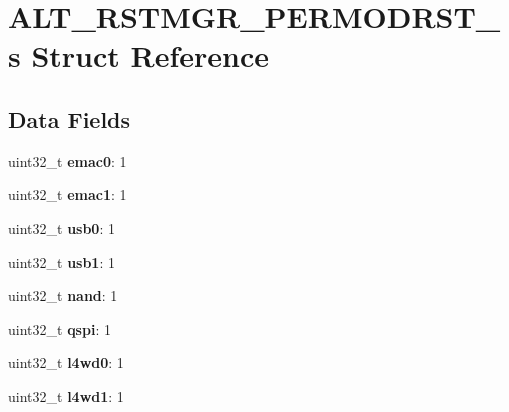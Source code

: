\hypertarget{structALT__RSTMGR__PERMODRST__s}{}\section{A\+L\+T\+\_\+\+R\+S\+T\+M\+G\+R\+\_\+\+P\+E\+R\+M\+O\+D\+R\+S\+T\+\_\+s Struct Reference}
\label{structALT__RSTMGR__PERMODRST__s}
\subsection*{Data Fields}
\begin{DoxyCompactItemize}
\item 
\mbox{\label{structALT__RSTMGR__PERMODRST__s_adfff218395efc631e0f0aeed3fa7256b}} 
uint32\+\_\+t {\bfseries emac0}\+: 1
\item 
\mbox{\label{structALT__RSTMGR__PERMODRST__s_a8b3dbb3ea0bcd294783259712868d7a6}} 
uint32\+\_\+t {\bfseries emac1}\+: 1
\item 
\mbox{\label{structALT__RSTMGR__PERMODRST__s_acf196eec7b98ac7cc7ab36801ee6f7af}} 
uint32\+\_\+t {\bfseries usb0}\+: 1
\item 
\mbox{\label{structALT__RSTMGR__PERMODRST__s_a599b962f7a67db3300dfba467865b794}} 
uint32\+\_\+t {\bfseries usb1}\+: 1
\item 
\mbox{\label{structALT__RSTMGR__PERMODRST__s_a5d51f45f8f6e18b527633007dbe75e00}} 
uint32\+\_\+t {\bfseries nand}\+: 1
\item 
\mbox{\label{structALT__RSTMGR__PERMODRST__s_a9aa6ba8945d17d631667345ae2d0c7f3}} 
uint32\+\_\+t {\bfseries qspi}\+: 1
\item 
\mbox{\label{structALT__RSTMGR__PERMODRST__s_a9878a8d7b4eb27cb8e41d361ee0924f1}} 
uint32\+\_\+t {\bfseries l4wd0}\+: 1
\item 
\mbox{\label{structALT__RSTMGR__PERMODRST__s_a5aee9861991f7c7f07ced94e51b55b00}} 
uint32\+\_\+t {\bfseries l4wd1}\+: 1

\end{DoxyCompactItemize}

